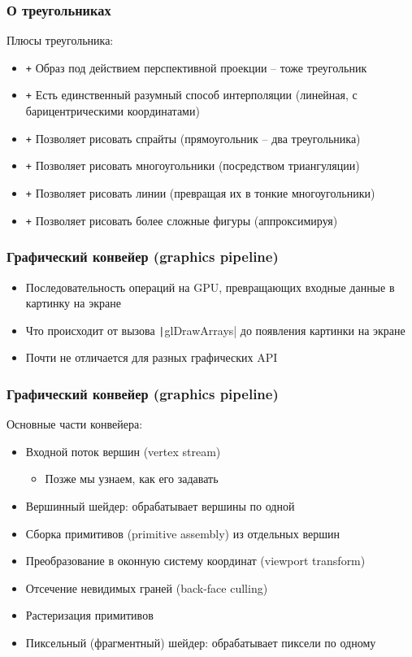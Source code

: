 \documentclass[10pt]{beamer}
\begin{document}
\begin{frame}
\frametitle{О треугольниках}
Плюсы треугольника:
\pause
\begin{itemize}
\item {\color{green}\texttt{+}} Образ под действием перспективной проекции -- тоже треугольник
\pause
\item {\color{green}\texttt{+}} Есть единственный разумный способ интерполяции (линейная, с барицентрическими координатами)
\pause
\item {\color{green}\texttt{+}} Позволяет рисовать спрайты (прямоугольник -- два треугольника)
\pause
\item {\color{green}\texttt{+}} Позволяет рисовать многоугольники (посредством триангуляции)
\pause
\item {\color{green}\texttt{+}} Позволяет рисовать линии (превращая их в тонкие многоугольники)
\pause
\item {\color{green}\texttt{+}} Позволяет рисовать более сложные фигуры (аппроксимируя)
\end{itemize}
\end{frame}

\begin{frame}[fragile]
\frametitle{Графический конвейер (graphics pipeline)}
\begin{itemize}
\item Последовательность операций на GPU, превращающих входные данные в картинку на экране
\pause
\item Что происходит от вызова \texttt|glDrawArrays| до появления картинки на экране
\pause
\item Почти не отличается для разных графических API
\end{itemize}
\end{frame}

\begin{frame}[fragile]
\frametitle{Графический конвейер (graphics pipeline)}
Основные части конвейера:
\begin{itemize}
\item Входной поток вершин (vertex stream)
\pause
\begin{itemize}
\item Позже мы узнаем, как его задавать
\end{itemize}
\pause
\item Вершинный шейдер: обрабатывает вершины по одной
\pause
\item Сборка примитивов (primitive assembly) из отдельных вершин
\pause
\item Преобразование в оконную систему координат (viewport transform)
\pause
\item Отсечение невидимых граней (back-face culling)
\pause
\item Растеризация примитивов
\pause
\item Пиксельный (фрагментный) шейдер: обрабатывает пиксели по одному
\end{itemize}
\end{frame}
\end{document}
